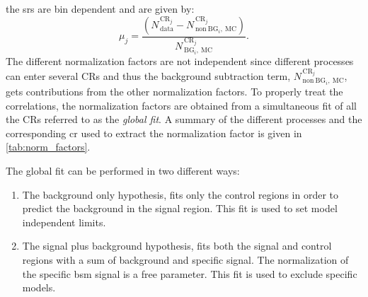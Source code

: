 the \glspl{sr} are bin dependent and are given by:
\begin{equation}
  \label{eq:102}
  \mu_{j} = \frac{(N_\mathrm{\, data}^{\mathrm{\, CR}_j} - N_{\mathrm{\,
        non~BG}_i,~\mathrm{MC}}^{\mathrm{\, CR}_j})}{N^{\mathrm{\,
        CR}_j}_{\mathrm{\, BG}_i \mathrm{,~MC}}}.
\end{equation}
The different normalization factors are not independent since different
processes can enter several CRs and thus the background subtraction term,
$N_{\mathrm{\, non~BG}_i,~\mathrm{MC}}^{\mathrm{\, CR}_j}$, gets contributions
from the other normalization factors. To properly treat the correlations, the
normalization factors are obtained from a simultaneous fit of all the CRs
referred to as the \emph{global fit}. A summary of the different processes and
the corresponding \gls{cr} used to extract the normalization factor is given in
\cref{tab:norm_factors}.

The global fit can be performed in two different ways:
\begin{enumerate}
\item The background only hypothesis, fits only the control regions in order to
  predict the background in the signal region. This fit is used to set model
  independent limits.
\item The signal plus background hypothesis, fits both the signal and control
  regions with a sum of background and specific signal. The normalization of the
  specific \gls{bsm} signal is a free parameter. This fit is used to exclude
  specific models.
\end{enumerate}
\begin{table}[!th]
  \centering
  \caption{Summary table of the different background processes and the
    corresponding control regions used to evaluate the bin dependent
    normalization factors.}
  \label{tab:norm_factors}
\end{table}

